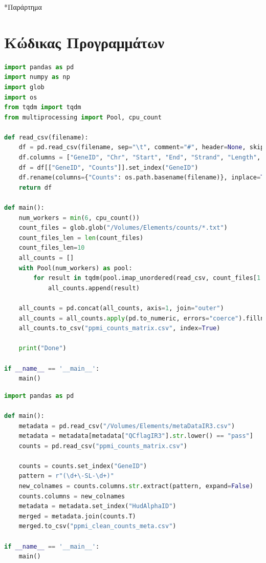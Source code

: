 \documentclass[12pt]{report}
\makeatletter
\let\oldchapter\chapter
\renewcommand{\chapter}{\@ifstar{\starchapter}{\nostarchapter}}
\newcommand{\starchapter}[1]{\oldchapter*{#1}\thispagestyle{mainstyle}}
\newcommand{\nostarchapter}[1]{\oldchapter{#1}\thispagestyle{mainstyle}}
\makeatother
\begin{document}
        
    \cleardoublepage
    \appendix
    \chapter*{Παράρτημα}
    
    \section*{Κώδικας Προγραμμάτων}\label{thesis:code}
    \begin{lstlisting}[language=Python,caption={read-data.py: Συκγρότηση CSV αρχείου με το σύνολο των δειγμάτων},label=lst:readdatapy]
import pandas as pd
import numpy as np
import glob
import os
from tqdm import tqdm
from multiprocessing import Pool, cpu_count

def read_csv(filename):
    df = pd.read_csv(filename, sep="\t", comment="#", header=None, skiprows=1)
    df.columns = ["GeneID", "Chr", "Start", "End", "Strand", "Length", "Counts"]
    df = df[["GeneID", "Counts"]].set_index("GeneID")
    df.rename(columns={"Counts": os.path.basename(filename)}, inplace=True)
    return df

def main():
    num_workers = min(6, cpu_count())
    count_files = glob.glob("/Volumes/Elements/counts/*.txt")
    count_files_len = len(count_files)
    count_files_len=10
    all_counts = []
    with Pool(num_workers) as pool:
        for result in tqdm(pool.imap_unordered(read_csv, count_files[1:10]), total=count_files_len, desc="Reading files"):
            all_counts.append(result)

    all_counts = pd.concat(all_counts, axis=1, join="outer")
    all_counts = all_counts.apply(pd.to_numeric, errors="coerce").fillna(0)
    all_counts.to_csv("ppmi_counts_matrix.csv", index=True)

    print("Done")

if __name__ == '__main__':
    main()
    \end{lstlisting}
    \begin{lstlisting}[language=Python,caption={prepare-data.py: Εισαγωγή Metadata και φιλτράρισμα ακατάλληλων δειγμάτων},label=lst:preparedatapy]
import pandas as pd

def main():
    metadata = pd.read_csv("/Volumes/Elements/metaDataIR3.csv")
    metadata = metadata[metadata["QCflagIR3"].str.lower() == "pass"]
    counts = pd.read_csv("ppmi_counts_matrix.csv")

    counts = counts.set_index("GeneID")
    pattern = r"(\d+\-SL-\d+)"
    new_colnames = counts.columns.str.extract(pattern, expand=False)
    counts.columns = new_colnames
    metadata = metadata.set_index("HudAlphaID")
    merged = metadata.join(counts.T)
    merged.to_csv("ppmi_clean_counts_meta.csv")

if __name__ == '__main__':
    main()
    \end{lstlisting}
\end{document}
